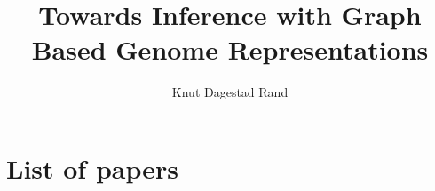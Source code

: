 \documentclass[]{uiophd}
\title{Towards Inference with Graph Based Genome Representations}
\author{Knut Dagestad Rand}
\begin{document}
\frontmatter
\maketitle

\chapter*{List of papers}

\tableofcontents

\mainmatter




\end{document}

